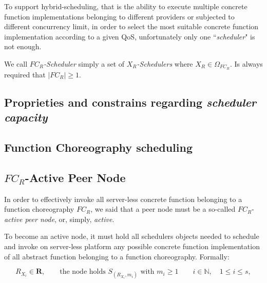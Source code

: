 \documentclass[10pt,a4paper]{article}
\begin{document}
To support hybrid-scheduling, that is the ability to execute multiple concrete function implementations belonging to different providers or subjected to different concurrency limit, in order to select the most suitable concrete function implementation according to a given QoS, unfortunately only one ``\textit{scheduler}" is not enough.

We call \textit{$FC_R$-Scheduler} simply a set of \textit{$X_{R}$-Schedulers} where $X_{R} \in \Omega_{FC_R}$. Is always required that $|FC_R| \geq 1$.











\subsection{Proprieties and constrains regarding \textit{scheduler capacity}}














\subsection{Function Choreography scheduling}



\subsection{$FC_R$-Active Peer Node}

In order to effectively invoke all server-less concrete function belonging to a function choreography $FC_R$, we said that a peer node must be a so-called $FC_R$-\textit{active peer node}, or, simply, \textit{active}.

To become an active node, it must hold all schedulers objects needed to schedule and invoke on server-less platform any possible concrete function implementation of all abstract function belonging to a function choreography. Formally:

\begin{equation}
R_{{X}_{i}} \in \textbf{R},  \qquad \text{the node holds } S_{({R_{X_i}},m_i)} \text{ with } m_i \geqslant 1 \qquad i \in \mathbb{N},\quad 1 \leq i \leq s, 
\end{equation}
\end{document}
